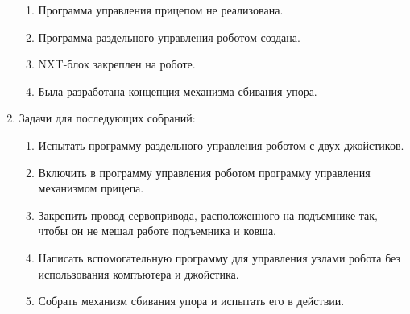 \begin{enumerate}
\begin{enumerate}
		\item Программа управления прицепом не реализована.
		
		\item Программа раздельного управления роботом создана.
		
		\item NXT-блок закреплен на роботе.
		
		\item Была разработана концепция механизма сбивания упора.
		
	\end{enumerate}
	
	\item Задачи для последующих собраний:
	\begin{enumerate}
		\item Испытать программу раздельного управления роботом с двух джойстиков.
		
		\item Включить в программу управления роботом программу управления механизмом прицепа.
		
		\item Закрепить провод сервопривода, расположенного на подъемнике так, чтобы он не мешал работе подъемника и ковша.
		
		\item Написать вспомогательную программу для управления узлами робота без использования компъютера и джойстика.
		
		\item Собрать механизм сбивания упора и испытать его в действии.
		
	\end{enumerate}     
\end{enumerate}
\fillpage

